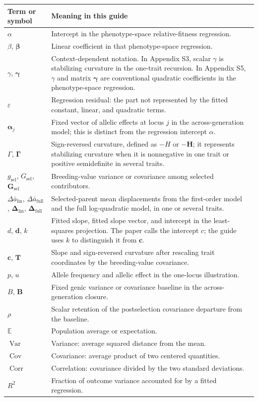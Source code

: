 \documentclass[11pt]{article}
\newcommand{\vect}[1]{\boldsymbol{#1}}
\newcommand{\mat}[1]{\mathbf{#1}}
\newcommand{\bGamma}{\boldsymbol{\Gamma}}
\newcommand{\bgamma}{\boldsymbol{\gamma}}
\newcommand{\E}{\mathbb{E}}
\newcommand{\Var}{\operatorname{Var}}
\newcommand{\Cov}{\operatorname{Cov}}
\newcommand{\Corr}{\operatorname{Corr}}
\newcommand{\Gsel}{\ensuremath{\mat G_{\mathrm{sel}}}}
\begin{document}
\begin{center}
\begin{tabularx}{\textwidth}{@{}p{}X@{}}
\toprule
Term or symbol & Meaning in this guide \\
\midrule
$\alpha$ & Intercept in the phenotype-space relative-fitness regression. \\
$\beta$, $\vect\beta$ & Linear coefficient in that phenotype-space regression. \\
$\gamma$, $\bgamma$ & Context-dependent notation.  In Appendix S3, scalar
$\gamma$ is stabilizing curvature in the one-trait recursion.  In Appendix
S5, $\gamma$ and matrix $\bgamma$ are conventional quadratic coefficients in
the phenotype-space regression. \\
$\varepsilon$ & Regression residual: the part not represented by the fitted
constant, linear, and quadratic terms. \\
$\vect\alpha_j$ & Fixed vector of allelic effects at locus $j$ in the
across-generation model; this is distinct from the regression intercept
$\alpha$. \\
$\Gamma$, $\bGamma$ & Sign-reversed curvature, defined as $-H$ or
$-\mat H$; it represents stabilizing curvature when it is nonnegative in one
trait or positive semidefinite in several traits. \\
$g_{\mathrm{sel}}$, $G_{\mathrm{sel}}$, $\Gsel$ & Breeding-value variance or
covariance among selected contributors. \\
$\Delta\bar a_{\mathrm{lin}}$, $\Delta\bar a_{\mathrm{full}}$,
$\vect\Delta_{\mathrm{lin}}$, $\vect\Delta_{\mathrm{full}}$ & Selected-parent
mean displacements from the first-order model and the full log-quadratic
model, in one or several traits. \\
$d$, $\vect d$, $k$ & Fitted slope, fitted slope vector, and intercept in the
least-squares projection.  The paper calls the intercept $c$; the guide uses
$k$ to distinguish it from $\vect c$. \\
$\vect c$, $\mat T$ & Slope and sign-reversed curvature after rescaling trait
coordinates by the breeding-value covariance. \\
$p$, $u$ & Allele frequency and allelic effect in the one-locus illustration. \\
$B$, $\mat B$ & Fixed genic variance or covariance baseline in the
across-generation closure. \\
$\rho$ & Scalar retention of the postselection covariance departure from the
baseline. \\
$\E$ & Population average or expectation. \\
$\Var$ & Variance: average squared distance from the mean. \\
$\Cov$ & Covariance: average product of two centered quantities. \\
$\Corr$ & Correlation: covariance divided by the two standard deviations. \\
$R^2$ & Fraction of outcome variance accounted for by a fitted regression. \\
\bottomrule
\end{tabularx}
\end{center}

\clearpage
\begingroup
\small


\endgroup
\end{document}
